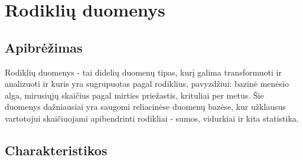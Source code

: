 \documentclass{VUMIFPSkursinis}
\begin{document}
\section{Rodiklių duomenys}

\subsection{Apibrėžimas}

Rodiklių duomenys - tai didelių duomenų tipas, kurį galima transformuoti ir analizuoti ir kuris yra sugrupuotas pagal rodiklius, 
pavyzdžiui: bazinė menėsio alga, mirusiųjų skaičius pagal mirties priežastis, krituliai per metus. Šie duomenys dažniausiai yra saugomi reliacinėse duomenų bazėse, 
kur užklausus vartotojui skaičiuojami apibendrinti rodikliai - sumos, vidurkiai ir kita statistika.
\subsection{Charakteristikos}
\end{document}
